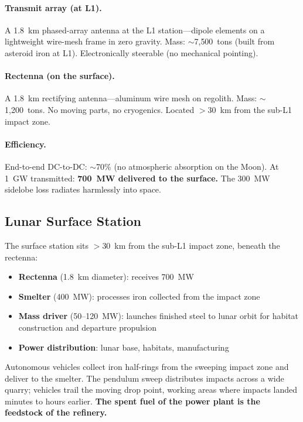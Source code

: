 \paragraph{Transmit array (at L1).}
A 1.8~km phased-array antenna at the L1 station---dipole elements on a lightweight wire-mesh frame in zero gravity. Mass: ${\sim}$7{,}500~tons (built from asteroid iron at L1). Electronically steerable (no mechanical pointing).

\paragraph{Rectenna (on the surface).}
A 1.8~km rectifying antenna---aluminum wire mesh on regolith. Mass: ${\sim}$1{,}200~tons. No moving parts, no cryogenics. Located $>$30~km from the sub-L1 impact zone.

\paragraph{Efficiency.}
End-to-end DC-to-DC: ${\sim}$70\% (no atmospheric absorption on the Moon). At 1~GW transmitted: \textbf{700~MW delivered to the surface.} The 300~MW sidelobe loss radiates harmlessly into space.

\subsection{Lunar Surface Station}

The surface station sits $>$30~km from the sub-L1 impact zone, beneath the rectenna:

\begin{itemize}[nosep]
\item \textbf{Rectenna} (1.8~km diameter): receives 700~MW
\item \textbf{Smelter} (400~MW): processes iron collected from the impact zone
\item \textbf{Mass driver} (50--120~MW): launches finished steel to lunar orbit for habitat construction and departure propulsion
\item \textbf{Power distribution}: lunar base, habitats, manufacturing
\end{itemize}

Autonomous vehicles collect iron half-rings from the sweeping impact zone and deliver to the smelter. The pendulum sweep distributes impacts across a wide quarry; vehicles trail the moving drop point, working areas where impacts landed minutes to hours earlier. \textbf{The spent fuel of the power plant is the feedstock of the refinery.}

